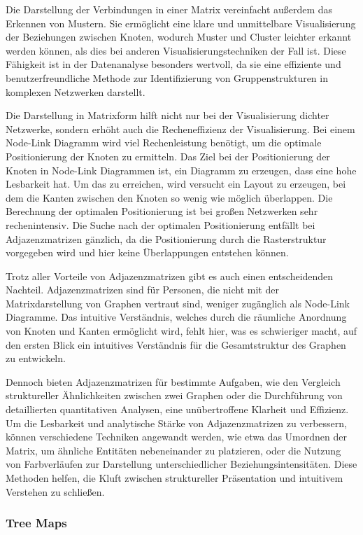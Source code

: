 Die Darstellung der Verbindungen in einer Matrix vereinfacht außerdem das Erkennen von Mustern. Sie ermöglicht eine klare und unmittelbare Visualisierung der Beziehungen zwischen Knoten, wodurch Muster und Cluster leichter erkannt werden können, als dies bei anderen Visualisierungstechniken der Fall ist. Diese Fähigkeit ist in der Datenanalyse besonders wertvoll, da sie eine effiziente und benutzerfreundliche Methode zur Identifizierung von Gruppenstrukturen in komplexen Netzwerken darstellt.

Die Darstellung in Matrixform hilft nicht nur bei der Visualisierung dichter Netzwerke, sondern erhöht auch die Recheneffizienz der Visualisierung. Bei einem Node-Link Diagramm wird viel Rechenleistung benötigt, um die optimale Positionierung der Knoten zu ermitteln. Das Ziel bei der Positionierung der Knoten in Node-Link Diagrammen ist, ein Diagramm zu erzeugen, dass eine hohe Lesbarkeit hat. Um das zu erreichen, wird versucht ein Layout zu erzeugen, bei dem die Kanten zwischen den Knoten so wenig wie möglich überlappen. Die Berechnung der optimalen Positionierung ist bei großen Netzwerken sehr rechenintensiv. Die Suche nach der optimalen Positionierung entfällt bei Adjazenzmatrizen gänzlich, da die Positionierung durch die Rasterstruktur vorgegeben wird und hier keine Überlappungen entstehen können.

Trotz aller Vorteile von Adjazenzmatrizen gibt es auch einen entscheidenden Nachteil. Adjazenzmatrizen sind für Personen, die nicht mit der Matrixdarstellung von Graphen vertraut sind, weniger zugänglich als Node-Link Diagramme. Das intuitive Verständnis, welches durch die räumliche Anordnung von Knoten und Kanten ermöglicht wird, fehlt hier, was es schwieriger macht, auf den ersten Blick ein intuitives Verständnis für die Gesamtstruktur des Graphen zu entwickeln.

Dennoch bieten Adjazenzmatrizen für bestimmte Aufgaben, wie den Vergleich struktureller Ähnlichkeiten zwischen zwei Graphen oder die Durchführung von detaillierten quantitativen Analysen, eine unübertroffene Klarheit und Effizienz. Um die Lesbarkeit und analytische Stärke von Adjazenzmatrizen zu verbessern, können verschiedene Techniken angewandt werden, wie etwa das Umordnen der Matrix, um ähnliche Entitäten nebeneinander zu platzieren, oder die Nutzung von Farbverläufen zur Darstellung unterschiedlicher Beziehungsintensitäten. Diese Methoden helfen, die Kluft zwischen struktureller Präsentation und intuitivem Verstehen zu schließen.

\subsubsection{Tree Maps}

